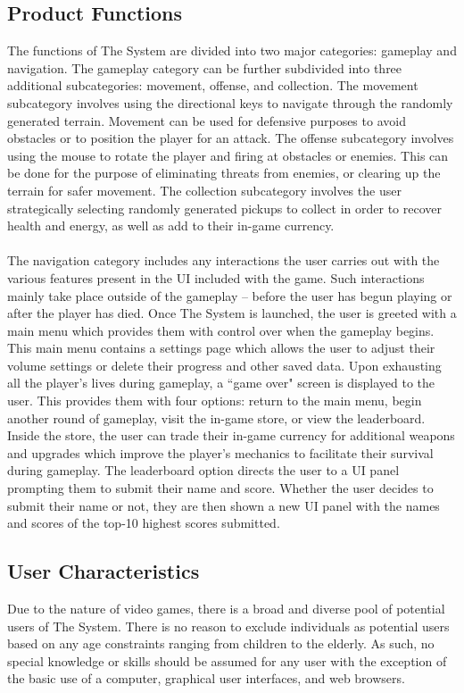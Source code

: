 \documentclass[12pt]{report}
\begin{document}
	\subsection{Product Functions}
		The functions of The System are divided into two major categories: gameplay and navigation. The gameplay category can be further subdivided into three additional subcategories: movement, offense, and collection. The movement subcategory involves using the directional keys to navigate through the randomly generated terrain. Movement can be used for defensive purposes to avoid obstacles or to position the player for an attack. The offense subcategory involves using the mouse to rotate the player and firing at obstacles or enemies. This can be done for the purpose of eliminating threats from enemies, or clearing up the terrain for safer movement. The collection subcategory involves the user strategically selecting randomly generated pickups to collect in order to recover health and energy, as well as add to their in-game currency.
\\ \\
The navigation category includes any interactions the user carries out with the various features present in the UI included with the game. Such interactions mainly take place outside of the gameplay -- before the user has begun playing or after the player has died. Once The System is launched, the user is greeted with a main menu which provides them with control over when the gameplay begins. This main menu contains a settings page which allows the user to adjust their volume settings or delete their progress and other saved data. Upon exhausting all the player's lives during gameplay, a ``game over" screen is displayed to the user. This provides them with four options: return to the main menu, begin another round of gameplay, visit the in-game store, or view the leaderboard. Inside the store, the user can trade their in-game currency for additional weapons and upgrades which improve the player's mechanics to facilitate their survival during gameplay. The leaderboard option directs the user to a UI panel prompting them to submit their name and score. Whether the user decides to submit their name or not, they are then shown a new UI panel with the names and scores of the top-10 highest scores submitted.
	\subsection{User Characteristics}
		Due to the nature of video games, there is a broad and diverse pool of potential users of The System. There is no reason to exclude individuals as potential users based on any age constraints ranging from children to the elderly. As such, no special knowledge or skills should be assumed for any user with the exception of the basic use of a computer, graphical user interfaces, and web browsers.
\end{document}
